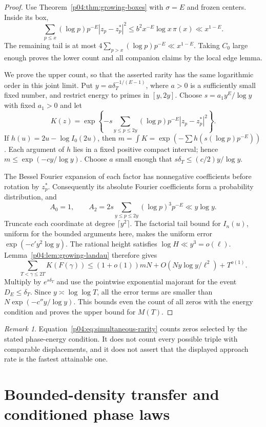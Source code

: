 \documentclass[11pt,letterpaper]{article}
\theoremstyle{definition}
\theoremstyle{remark}
\newtheorem{remark}[theorem]{Remark}
\newcommand{\1}{\mathbf 1}
\begin{document}
\begin{proof}
Use Theorem~\ref{p04:thm:growing-boxes} with $\sigma=E$ and frozen
centers. Inside its box,
\[
 \sum_{p\le x}(\log p)p^{-E}|z_p-z_p^*|^2
 \le b^2x^{-E}\log x\,\pi(x)\ll x^{1-E}.
\]
The remaining tail is at most
$4\sum_{p>x}(\log p)p^{-E}\ll x^{1-E}$.
Taking $C_0$ large enough proves the lower count and all companion
claims by the local edge lemma.

We prove the upper count, so that the asserted rarity has the same
logarithmic order in this joint limit. Put
$y=a\delta_T^{-1/(E-1)}$, where $a>0$ is a sufficiently small
fixed number, and restrict energy to primes in $[y,2y]$.
Choose $s=a_1y^E/\log y$ with fixed $a_1>0$ and let
\[
 K(z)=\exp\left\{-s\sum_{y\le p\le2y}
                    (\log p)p^{-E}|z_p-z_p^*|^2\right\}.
\]
If $h(u)=2u-\log I_0(2u)$, then
$m=\int K=\exp(-\sum h(s(\log p)p^{-E}))$.
Each argument of $h$ lies in a fixed positive compact interval;
hence $m\le\exp(-c y/\log y)$. Choose $a$ small enough that
$s\delta_T\le(c/2)y/\log y$.

The Bessel Fourier expansion of each factor has nonnegative
coefficients before rotation by $z_p^*$. Consequently its absolute
Fourier coefficients form a probability distribution, and
\[
 A_0=1,\qquad
 A_2=2s\sum_{y\le p\le2y}(\log p)^3p^{-E}
       \ll y\log y.
\]
Truncate each coordinate at degree $\lceil y^2\rceil$.
The factorial tail bound for $I_n(u)$, uniform for the bounded
arguments here, makes the uniform error $\exp(-c'y^2\log y)$.
The rational height satisfies $\log H\ll y^3=o(\ell)$.
Lemma~\ref{p04:lem:growing-landau} therefore gives
\[
 \sum_{T<\gamma\le2T}K(F(\gamma))
 \le (1+o(1))mN+O(Ny\log y/\ell^2)+T^{o(1)}.
\]
Multiply by $e^{s\delta_T}$ and use the pointwise exponential
majorant for the event $D_E\le\delta_T$. Since
$y\asymp\log\log T$, all the error terms are smaller than
$N\exp(-c''y/\log y)$. This bounds even the count of all zeros
with the energy condition and proves the upper bound for $M(T)$.
\end{proof}

\begin{remark}
Equation~\eqref{p04:eq:simultaneous-rarity} counts zeros selected by
the stated phase-energy condition. It does not count every possible
triple with comparable displacements, and it does not assert that
the displayed approach rate is the fastest attainable one.
\end{remark}




\section{Bounded-density transfer and conditioned phase laws}
\label{p04:sec:bounded-transfer}
\end{document}
